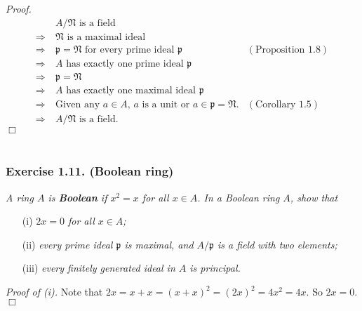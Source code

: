 \documentclass{article}
\begin{document}
\emph{Proof.}
  \begin{align*}
  &\:
  \text{$A/\mathfrak{N}$ is a field} \\
  \Longrightarrow &\:
  \text{$\mathfrak{N}$ is a maximal ideal} \\
  \Longrightarrow &\:
  \text{$\mathfrak{p} = \mathfrak{N}$ for every prime ideal $\mathfrak{p}$}
    &(\text{Proposition 1.8}) \\
  \Longrightarrow &\:
  \text{$A$ has exactly one prime ideal $\mathfrak{p}$} \\
  \Longrightarrow &\:
  \mathfrak{p} = \mathfrak{N} \\
  \Longrightarrow &\:
  \text{$A$ has exactly one maximal ideal $\mathfrak{p}$} \\
  \Longrightarrow &\:
  \text{Given any $a \in A$, $a$ is a unit or $a \in \mathfrak{p} = \mathfrak{N}$.}
    &(\text{Corollary 1.5}) \\
  \Longrightarrow &\:
  \text{$A/\mathfrak{N}$ is a field}.
  \end{align*}
$\Box$ \\\\






\subsubsection*{Exercise 1.11. (Boolean ring)}
\emph{A ring $A$ is \textbf{Boolean} if $x^2 = x$ for all $x \in A$.
In a Boolean ring $A$, show that}
\begin{enumerate}
\item[(i)]
  \emph{$2x = 0$ for all $x \in A$;}

\item[(ii)]
  \emph{every prime ideal $\mathfrak{p}$ is maximal, and $A/\mathfrak{p}$ is a field with two elements;}

\item[(iii)]
  \emph{every finitely generated ideal in $A$ is principal.} \\
\end{enumerate}



\emph{Proof of (i).}
  Note that $2x = x+x = (x+x)^2 = (2x)^2 = 4x^2 = 4x$.
  So $2x = 0$.
$\Box$ \\
\end{document}

